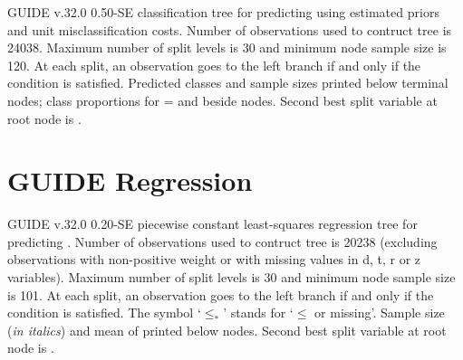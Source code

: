 \documentclass[12pt]{article}
\begin{document}
GUIDE v.32.0  0.50-SE
classification tree for predicting \texttt{} using
estimated priors
and unit misclassification costs.
 Number of observations used to contruct tree is 24038.
 Maximum number of split levels is 30 and minimum node sample size is 120.
At each split, an observation goes to the left branch 
 if and only if the condition is satisfied.
Predicted classes and sample sizes printed below terminal nodes;
 class proportions for \texttt{} =
 \texttt{} and \texttt{} beside nodes.
Second best split variable at root node is \texttt{}.
\section{GUIDE Regression}
 \begin{center}
 \end{center}
GUIDE v.32.0  0.20-SE
piecewise constant least-squares regression tree
for predicting \texttt{}.
 Number of observations used to contruct tree is 20238
 (excluding observations with non-positive weight or with missing values
 in d, t, r or z variables).
 Maximum number of split levels is 30 and minimum node sample size is 101.
At each split, an observation goes to the left branch 
 if and only if the condition is satisfied.
 The symbol `$\leq_*$' stands for `$\leq$ or missing'.
Sample size (\emph{in italics}) and mean of \texttt{} printed below nodes.
Second best split variable at root node is \texttt{}.
\end{document}

